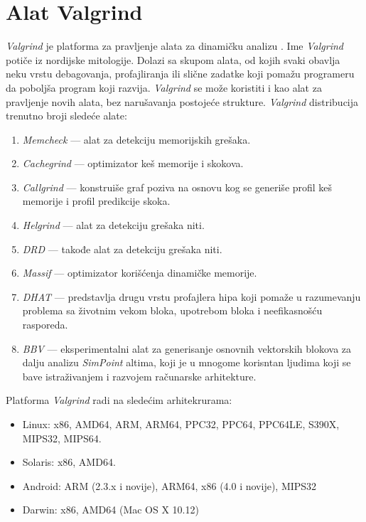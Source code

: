 \documentclass[12pt,oneside]{memoir}
\theoremstyle{plain}
\theoremstyle{definition}
\begin{document}
\chapter{Alat Valgrind}
\textit{Valgrind} je platforma za pravljenje alata za dinamičku analizu \cite{Valgrind}. Ime \textit{Valgrind} potiče iz nordijske mitologije.  Dolazi sa skupom alata, od kojih svaki obavlja neku vrstu debagovanja, profajliranja ili slične zadatke koji pomažu programeru da poboljša program koji razvija. \textit{Valgrind} se može koristiti i kao alat za pravljenje novih alata, bez narušavanja postojeće strukture. 
\textit{Valgrind} distribucija trenutno broji sledeće alate:
\begin{enumerate}
  \item \textit{Memcheck} \cite{Memcheck} --- alat za detekciju memorijskih grešaka.
  \item \textit{Cachegrind}  \cite{Cachegrind} --- optimizator keš memorije i skokova. 
  \item \textit{Callgrind} \cite{Callgrind} --- konstruiše graf poziva na osnovu kog se generiše profil keš memorije i profil predikcije skoka. %
  \item \textit{Helgrind} \cite{Helgrind} --- alat za detekciju grešaka niti.
  \item \textit{DRD} \cite{Drd} --- takođe alat za detekciju grešaka niti. %
  \item \textit{Massif} \cite{Massif} --- optimizator korišćenja dinamičke memorije.
  \item \textit{DHAT} \cite{DHAT} --- predstavlja drugu vrstu profajlera hipa koji pomaže u razumevanju problema sa životnim vekom bloka, upotrebom bloka i neefikasnošću rasporeda.
  \item \textit{BBV} \cite{BBV} --- eksperimentalni alat za generisanje osnovnih vektorskih blokova za dalju analizu \textit{SimPoint} altima, koji je u mnogome korisntan ljudima koji se bave istraživanjem i razvojem računarske arhitekture.
\end{enumerate}
Platforma \textit{Valgrind} radi na sledećim arhitekrurama:
\begin{itemize}
  \item Linux: x86, AMD64, ARM, ARM64, PPC32, PPC64, PPC64LE, S390X, MIPS32, MIPS64.
  \item Solaris: x86, AMD64. 
  \item Android: ARM (2.3.x i novije), ARM64, x86 (4.0 i novije), MIPS32 
  \item Darwin: x86, AMD64 (Mac OS X 10.12)\cite{Valgrind}
\end{itemize}
\end{document}

